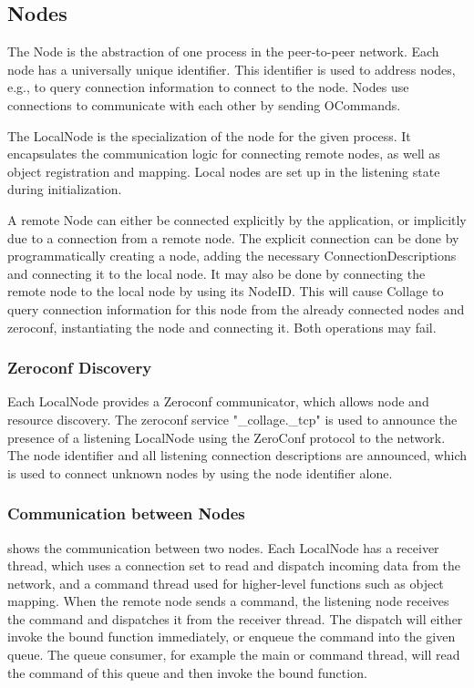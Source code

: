 \subsection{Nodes}

The \textsf{Node} is the abstraction of one process in the peer-to-peer network.
Each node has a universally unique identifier. This identifier is used to
address nodes, e.g., to query connection information to connect to the node.
Nodes use connections to communicate with each other by sending
\textsf{OCommand}s.

The \textsf{LocalNode} is the specialization of the node for the given process.
It encapsulates the communication logic for connecting remote nodes, as well as
object registration and mapping. Local nodes are set up in the listening state
during initialization.

A remote \textsf{Node} can either be connected explicitly by the application,
or implicitly due to a connection from a remote node. The explicit connection
can be done by programmatically creating a node, adding the necessary
\textsf{ConnectionDescription}s and connecting it to the local node. It may
also be done by connecting the remote node to the local node by using its
\textsf{NodeID}. This will cause Collage to query connection information for
this node from the already connected nodes and zeroconf, instantiating the node
and connecting it. Both operations may fail.

\subsubsection{\label{sZeroconf}Zeroconf Discovery}

Each \textsf{LocalNode} provides a \textsf{Zeroconf} communicator, which allows
node and resource discovery. The zeroconf service "\_collage.\_tcp" is used to
announce the presence of a listening \textsf{LocalNode} using the ZeroConf
protocol to the network. The node identifier and all listening connection
descriptions are announced, which is used to connect unknown nodes by using the
node identifier alone.

\subsubsection{Communication between Nodes}

 shows the communication between two nodes. Each
\textsf{LocalNode} has a receiver thread, which uses a connection set to read
and dispatch incoming data from the network, and a command thread used for
higher-level functions such as object mapping. When the remote node sends a
command, the listening node receives the command and dispatches it from the
receiver thread. The dispatch will either invoke the bound function immediately,
or enqueue the command into the given queue. The queue consumer, for example the
main or command thread, will read the command of this queue and then invoke the
bound function.

